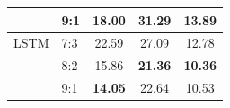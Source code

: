 \documentclass[conference]{IEEEtran}
\begin{document}
\begin{table}[ht]
\begin{tabular}{|l|l|c|c|c|}
                               & 9:1                         & \textbf{18.00}            & \textbf{31.29}                 & \textbf{13.89}           \\ \hline
        LSTM                   & 7:3                         & 22.59                     & 27.09                          & 12.78                    \\ \cline{2-5}
                               & 8:2                         & 15.86                     & \textbf{21.36}                 & \textbf{10.36}           \\ \cline{2-5}
                               & 9:1                         & \textbf{14.05}            & 22.64                          & 10.53                    \\ \hline
    \end{tabular}
\end{table}
\end{document}
